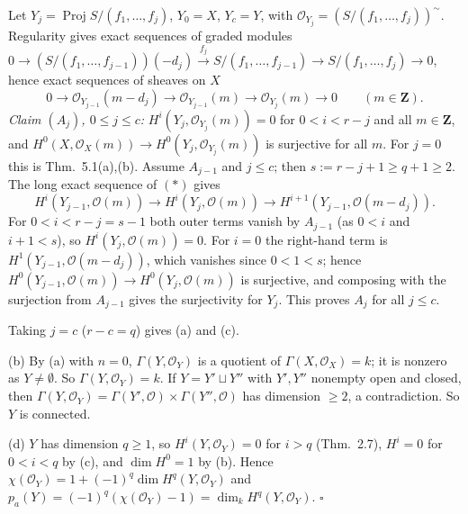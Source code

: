 \documentclass[11pt]{article}
\begin{document}
Let $Y_j=\operatorname{Proj}S/(f_1,\dots,f_j)$, $Y_0=X$, $Y_c=Y$, with $\mathcal O_{Y_j}=(S/(f_1,\dots,f_j))^\sim$. Regularity gives exact sequences of graded modules $0\to (S/(f_1,\dots,f_{j-1}))(-d_j)\xrightarrow{f_j}S/(f_1,\dots,f_{j-1})\to S/(f_1,\dots,f_j)\to0$, hence exact sequences of sheaves on $X$
\[
0\to\mathcal O_{Y_{j-1}}(m-d_j)\to\mathcal O_{Y_{j-1}}(m)\to\mathcal O_{Y_j}(m)\to0\qquad(m\in\mathbf Z).\tag{$*$}
\]
\emph{Claim $(A_j)$, $0\le j\le c$:} $H^i(Y_j,\mathcal O_{Y_j}(m))=0$ for $0<i<r-j$ and all $m\in\mathbf Z$, and $H^0(X,\mathcal O_X(m))\to H^0(Y_j,\mathcal O_{Y_j}(m))$ is surjective for all $m$. For $j=0$ this is Thm.~5.1(a),(b). Assume $A_{j-1}$ and $j\le c$; then $s:=r-j+1\ge q+1\ge2$. The long exact sequence of $(*)$ gives
\[
H^i(Y_{j-1},\mathcal O(m))\to H^i(Y_j,\mathcal O(m))\to H^{i+1}(Y_{j-1},\mathcal O(m-d_j)).
\]
For $0<i<r-j=s-1$ both outer terms vanish by $A_{j-1}$ (as $0<i$ and $i+1<s$), so $H^i(Y_j,\mathcal O(m))=0$. For $i=0$ the right-hand term is $H^1(Y_{j-1},\mathcal O(m-d_j))$, which vanishes since $0<1<s$; hence $H^0(Y_{j-1},\mathcal O(m))\to H^0(Y_j,\mathcal O(m))$ is surjective, and composing with the surjection from $A_{j-1}$ gives the surjectivity for $Y_j$. This proves $A_j$ for all $j\le c$.

Taking $j=c$ ($r-c=q$) gives (a) and (c).

(b) By (a) with $n=0$, $\Gamma(Y,\mathcal O_Y)$ is a quotient of $\Gamma(X,\mathcal O_X)=k$; it is nonzero as $Y\neq\emptyset$. So $\Gamma(Y,\mathcal O_Y)=k$. If $Y=Y'\sqcup Y''$ with $Y',Y''$ nonempty open and closed, then $\Gamma(Y,\mathcal O_Y)=\Gamma(Y',\mathcal O)\times\Gamma(Y'',\mathcal O)$ has dimension $\ge2$, a contradiction. So $Y$ is connected.

(d) $Y$ has dimension $q\ge1$, so $H^i(Y,\mathcal O_Y)=0$ for $i>q$ (Thm.~2.7), $H^i=0$ for $0<i<q$ by (c), and $\dim H^0=1$ by (b). Hence $\chi(\mathcal O_Y)=1+(-1)^q\dim H^q(Y,\mathcal O_Y)$ and $p_a(Y)=(-1)^q(\chi(\mathcal O_Y)-1)=\dim_kH^q(Y,\mathcal O_Y)$. \hfill$\square$
\end{document}
